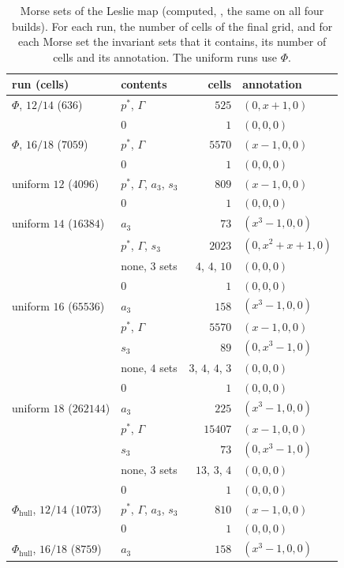 \documentclass[11pt]{article}
\theoremstyle{plain}
\theoremstyle{definition}
\theoremstyle{remark}
\newcommand{\Phihull}{\Phi_{\mathrm{hull}}}
\begin{document}
\begin{table}[tbp]
\centering
\caption{Morse sets of the Leslie map (computed, , the same on all four builds). For each run, the number of cells of the final grid, and for each Morse set the invariant sets that it contains, its number of cells and its annotation. The uniform runs use $\Phi$.}\label{tab:morse}
\small
\begin{tabular}{llrl}
\toprule
run (cells) & contents & cells & annotation \\
\midrule
$\Phi$, $12/14$ ($636$) & $p^*$, $\Gamma$ & $525$ & $(0,x+1,0)$ \\
 & $0$ & $1$ & $(0,0,0)$ \\
$\Phi$, $16/18$ ($7059$) & $p^*$, $\Gamma$ & $5570$ & $(x-1,0,0)$ \\
 & $0$ & $1$ & $(0,0,0)$ \\
uniform $12$ ($4096$) & $p^*$, $\Gamma$, $a_3$, $s_3$ & $809$ & $(x-1,0,0)$ \\
 & $0$ & $1$ & $(0,0,0)$ \\
uniform $14$ ($16384$) & $a_3$ & $73$ & $(x^3-1,0,0)$ \\
 & $p^*$, $\Gamma$, $s_3$ & $2023$ & $(0,x^2+x+1,0)$ \\
 & none, $3$ sets & $4$, $4$, $10$ & $(0,0,0)$ \\
 & $0$ & $1$ & $(0,0,0)$ \\
uniform $16$ ($65536$) & $a_3$ & $158$ & $(x^3-1,0,0)$ \\
 & $p^*$, $\Gamma$ & $5570$ & $(x-1,0,0)$ \\
 & $s_3$ & $89$ & $(0,x^3-1,0)$ \\
 & none, $4$ sets & $3$, $4$, $4$, $3$ & $(0,0,0)$ \\
 & $0$ & $1$ & $(0,0,0)$ \\
uniform $18$ ($262144$) & $a_3$ & $225$ & $(x^3-1,0,0)$ \\
 & $p^*$, $\Gamma$ & $15407$ & $(x-1,0,0)$ \\
 & $s_3$ & $73$ & $(0,x^3-1,0)$ \\
 & none, $3$ sets & $13$, $3$, $4$ & $(0,0,0)$ \\
 & $0$ & $1$ & $(0,0,0)$ \\
$\Phihull$, $12/14$ ($1073$) & $p^*$, $\Gamma$, $a_3$, $s_3$ & $810$ & $(x-1,0,0)$ \\
 & $0$ & $1$ & $(0,0,0)$ \\
$\Phihull$, $16/18$ ($8759$) & $a_3$ & $158$ & $(x^3-1,0,0)$ \\

\end{tabular}
\end{table}
\end{document}
